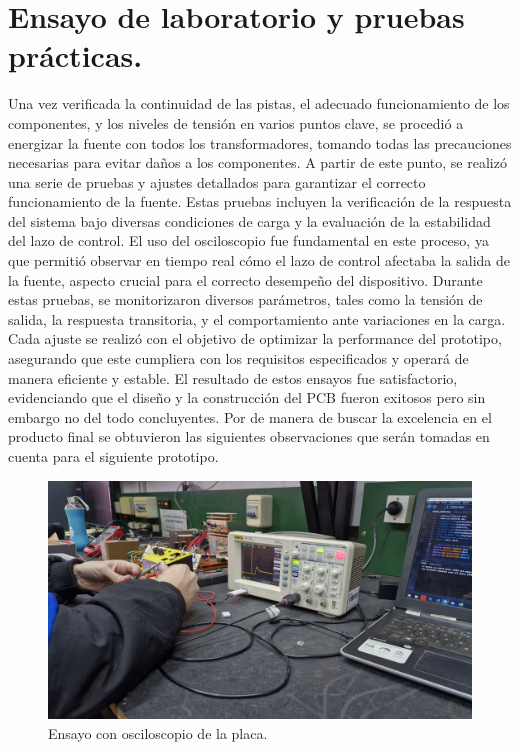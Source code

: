 \section{Ensayo de laboratorio y pruebas prácticas.}
Una vez verificada la continuidad de las pistas, el adecuado funcionamiento de los componentes, y los niveles de tensión en varios puntos clave, se procedió a energizar la fuente con todos los transformadores, tomando todas las precauciones necesarias para evitar daños a los componentes.
A partir de este punto, se realizó una serie de pruebas y ajustes detallados para garantizar el correcto funcionamiento de la fuente. Estas pruebas incluyen la verificación de la respuesta del sistema bajo diversas condiciones de carga y la evaluación de la estabilidad del lazo de control. El uso del osciloscopio fue fundamental en este proceso, ya que permitió observar en tiempo real cómo el lazo de control afectaba la salida de la fuente, aspecto crucial para el correcto desempeño del dispositivo.
Durante estas pruebas, se monitorizaron diversos parámetros, tales como la tensión de salida, la respuesta transitoria, y el comportamiento ante variaciones en la carga. Cada ajuste se realizó con el objetivo de optimizar la performance del prototipo, asegurando que este cumpliera con los requisitos especificados y operará de manera eficiente y estable.
El resultado de estos ensayos fue satisfactorio, evidenciando que el diseño y la construcción del PCB fueron exitosos pero sin embargo no del todo concluyentes. Por de manera de buscar la excelencia en el producto final se obtuvieron las siguientes observaciones que serán tomadas en cuenta para el siguiente prototipo.  
\begin{figure}[H]
    \centering
    \includegraphics[scale=0.1]{./imagenes/fotos/osciloscopio.jpg}
    \caption{Ensayo con osciloscopio de la placa.}
    \label{F:esayos_y_pruebas}
\end{figure}

